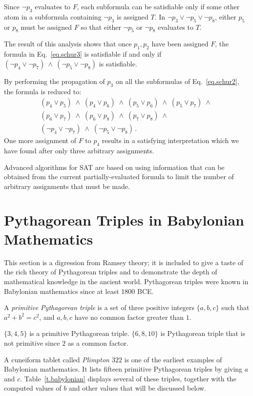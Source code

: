 Since $\neg p_3$ evaluates to $F$, each subformula can be satisfiable only if some other atom in a subformula containing $\neg p_3$ is assigned $T$. In $\neg p_3 \vee \neg p_5 \vee \neg p_8$, either $p_5$ or $p_8$ must be assigned $F$ so that either $\neg p_5$ or $\neg p_8$ evaluates to $T$.

The result of this analysis shows that once $p_1,p_2$ have been assigned $F$, the formula in Eq.~\ref{eq.schur3} is satisfiable if and only if $(\neg p_4 \vee \neg p_7) \:\wedge\: (\neg p_5 \vee \neg p_8)$ is satisfiable.

By performing the propagation of $p_3$ on all the subformulas of Eq.~\ref{eq.schur2}, the formula is reduced to:
\[
\begin{array}{l}
(p_4\vee p_5)\;\wedge\;(p_4\vee p_6)\;\wedge\;(p_5\vee p_6)\;\wedge\;(p_5\vee p_7)\;\wedge\;\\
(p_6\vee p_7)\;\wedge\;(p_6\vee p_8)\;\wedge\;(p_7\vee p_8)\;\wedge\\
(\neg p_4\vee \neg p_7)\;\wedge\;
(\neg p_5\vee \neg p_8)\,.
\end{array}
\]
One more assignment of $F$ to $p_4$ results in a satisfying interpretation which we have found after only three arbitrary assignments.

Advanced algorithms for SAT are based on using information that can be obtained from the current partially-evaluated formula to limit the number of arbitrary assignments that must be made.


\section{Pythagorean Triples in Babylonian Mathematics}\label{s.plimpton}

This section is a digression from Ramsey theory; it is included to give a taste of the rich theory of Pythagorean triples and to demonstrate the depth of mathematical knowledge in the ancient world. Pythagorean triples were known in Babylonian mathematics since at least 1800 BCE.
\begin{definition}
A \emph{primitive Pythagorean triple} is a set of three positive integers $\{a,b,c\}$ such that $a^2+b^2=c^2$, and $a,b,c$ have no common factor greater than $1$.
\end{definition}
\begin{example}
$\{3,4,5\}$ is a primitive Pythagorean triple. $\{6,8,10\}$ is Pythagorean triple that is not primitive since $2$ as a common factor.
\end{example}
A cuneiform tablet called \emph{Plimpton $322$} is one of the earliest examples of Babylonian mathematics. It lists fifteen primitive Pythagorean triples by giving $a$ and $c$. Table~\ref{t.babylonian} displays several of these triples, together with the computed values of $b$ and other values that will be discussed below.

